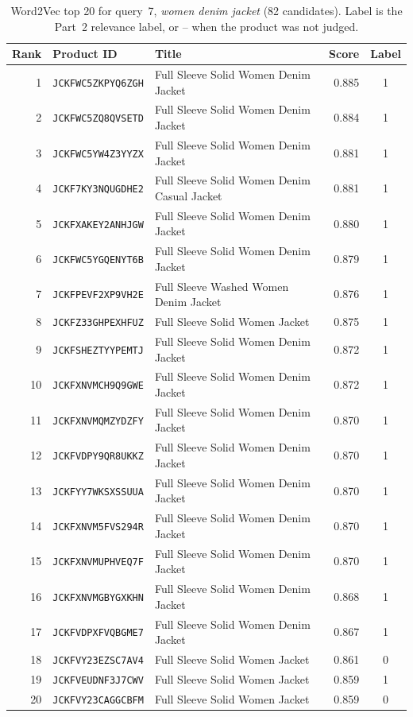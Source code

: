 \documentclass[11pt,a4paper]{article}
\begin{document}
\begin{table}[htbp]
  \centering
  \small
  \caption{Word2Vec top 20 for query~7, \emph{women denim jacket} (82 candidates). Label is
  the Part~2 relevance label, or -- when the product was not judged.}
  \label{tab:w2v-q7}
  \begin{tabular}{rlp{7.2cm}rc}
    \toprule
    Rank & Product ID & Title & Score & Label \\
    \midrule
    1 & \texttt{JCKFWC5ZKPYQ6ZGH} & Full Sleeve Solid Women Denim Jacket & 0.885 & 1 \\
    2 & \texttt{JCKFWC5ZQ8QVSETD} & Full Sleeve Solid Women Denim Jacket & 0.884 & 1 \\
    3 & \texttt{JCKFWC5YW4Z3YYZX} & Full Sleeve Solid Women Denim Jacket & 0.881 & 1 \\
    4 & \texttt{JCKF7KY3NQUGDHE2} & Full Sleeve Solid Women Denim Casual Jacket & 0.881 & 1 \\
    5 & \texttt{JCKFXAKEY2ANHJGW} & Full Sleeve Solid Women Denim Jacket & 0.880 & 1 \\
    6 & \texttt{JCKFWC5YGQENYT6B} & Full Sleeve Solid Women Denim Jacket & 0.879 & 1 \\
    7 & \texttt{JCKFPEVF2XP9VH2E} & Full Sleeve Washed Women Denim Jacket & 0.876 & 1 \\
    8 & \texttt{JCKFZ33GHPEXHFUZ} & Full Sleeve Solid Women Jacket & 0.875 & 1 \\
    9 & \texttt{JCKFSHEZTYYPEMTJ} & Full Sleeve Solid Women Denim Jacket & 0.872 & 1 \\
    10 & \texttt{JCKFXNVMCH9Q9GWE} & Full Sleeve Solid Women Denim Jacket & 0.872 & 1 \\
    11 & \texttt{JCKFXNVMQMZYDZFY} & Full Sleeve Solid Women Denim Jacket & 0.870 & 1 \\
    12 & \texttt{JCKFVDPY9QR8UKKZ} & Full Sleeve Solid Women Denim Jacket & 0.870 & 1 \\
    13 & \texttt{JCKFYY7WKSXSSUUA} & Full Sleeve Solid Women Denim Jacket & 0.870 & 1 \\
    14 & \texttt{JCKFXNVM5FVS294R} & Full Sleeve Solid Women Denim Jacket & 0.870 & 1 \\
    15 & \texttt{JCKFXNVMUPHVEQ7F} & Full Sleeve Solid Women Denim Jacket & 0.870 & 1 \\
    16 & \texttt{JCKFXNVMGBYGXKHN} & Full Sleeve Solid Women Denim Jacket & 0.868 & 1 \\
    17 & \texttt{JCKFVDPXFVQBGME7} & Full Sleeve Solid Women Denim Jacket & 0.867 & 1 \\
    18 & \texttt{JCKFVY23EZSC7AV4} & Full Sleeve Solid Women Jacket & 0.861 & 0 \\
    19 & \texttt{JCKFVEUDNF3J7CWV} & Full Sleeve Solid Women Jacket & 0.859 & 1 \\
    20 & \texttt{JCKFVY23CAGGCBFM} & Full Sleeve Solid Women Jacket & 0.859 & 0 \\
    \bottomrule
  \end{tabular}
\end{table}
\end{document}
